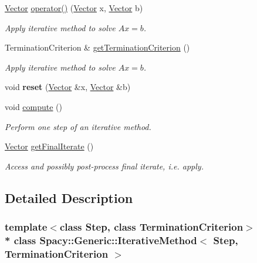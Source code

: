 \begin{DoxyCompactItemize}
\item 
\hyperlink{classSpacy_1_1Generic_1_1Vector}{Vector} \hyperlink{classSpacy_1_1Generic_1_1IterativeMethod_a87278a2b0ef67d35c3bd000415efec6a}{operator()} (\hyperlink{classSpacy_1_1Generic_1_1Vector}{Vector} x, \hyperlink{classSpacy_1_1Generic_1_1Vector}{Vector} b)
\begin{DoxyCompactList}\small\item\em Apply iterative method to solve $Ax=b$. \end{DoxyCompactList}\item 
Termination\+Criterion \& \hyperlink{classSpacy_1_1Generic_1_1IterativeMethod_a9e112dd05cb8a45a28dc601a2aff6105}{get\+Termination\+Criterion} ()
\begin{DoxyCompactList}\small\item\em Apply iterative method to solve $Ax=b$. \end{DoxyCompactList}\item 
void {\bfseries reset} (\hyperlink{classSpacy_1_1Generic_1_1Vector}{Vector} \&x, \hyperlink{classSpacy_1_1Generic_1_1Vector}{Vector} \&b)\hypertarget{classSpacy_1_1Generic_1_1Step_a9369b492a0e8233de616a8a08415f92e}{}\label{classSpacy_1_1Generic_1_1Step_a9369b492a0e8233de616a8a08415f92e}

\item 
void \hyperlink{classSpacy_1_1Generic_1_1Step_ac400c25a81a5138b4926bbb99692b343}{compute} ()
\begin{DoxyCompactList}\small\item\em Perform one step of an iterative method. \end{DoxyCompactList}\item 
\hyperlink{classSpacy_1_1Generic_1_1Vector}{Vector} \hyperlink{classSpacy_1_1Generic_1_1Step_a5be9a8afa47319b645b2df73b3b23acc}{get\+Final\+Iterate} ()
\begin{DoxyCompactList}\small\item\em Access and possibly post-\/process final iterate, i.\+e. apply. \end{DoxyCompactList}\end{DoxyCompactItemize}


\subsection{Detailed Description}
\subsubsection*{template$<$class Step, class Termination\+Criterion$>$\\*
class Spacy\+::\+Generic\+::\+Iterative\+Method$<$ Step, Termination\+Criterion $>$}

